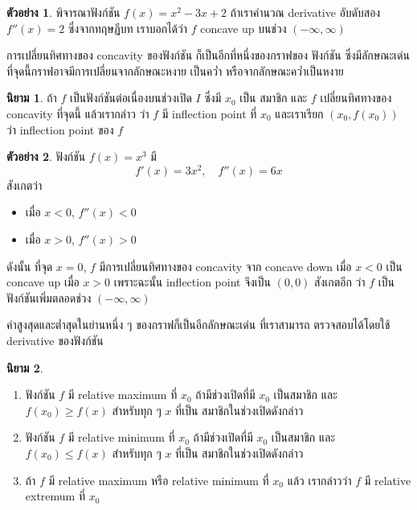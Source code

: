 \documentclass[
]{book}
\theoremstyle{definition}
\newtheorem{definition}{นิยาม}[chapter]
\theoremstyle{definition}
\newtheorem{example}{ตัวอย่าง}[chapter]
\theoremstyle{definition}
\theoremstyle{definition}
\theoremstyle{remark}
\begin{document}
\begin{example}
พิจารณาฟังก์ชัน \(f(x) = x^2-3x+2\) ถ้าเราคำนวณ derivative อับดับสอง \(f''(x) = 2\)
ซึ่งจากทฤษฏีบท เราบอกได้ว่า \(f\) concave up บนช่วง \((-\infty,\infty)\)
\end{example}

การเปลี่ยนทิศทางของ concavity ของฟังก์ชัน ก็เป็นอีกที่หนึ่งของกราฟของ ฟังก์ชัน
ซึ่งมีลักษณะเด่น ที่จุดนี้กราฟอาจมีการเปลี่ยนจากลักษณะหงาย เป็นคว่ำ
หรือจากลักษณะคว่ำเป็นหงาย

\begin{definition}
ถ้า \(f\) เป็นฟังก์ชันต่อเนื่องบนช่วงเปิด \(I\) ซึ่งมี \(x_0\) เป็น สมาชิก และ \(f\)
เปลี่ยนทิศทางของ concavity ที่จุดนี้ แล้วเรากล่าว ว่า \(f\) มี inflection point ที่
\(x_0\) และเราเรียก \((x_0,f(x_0))\) ว่า inflection point ของ \(f\)
\end{definition}

\begin{example}
ฟังก์ชัน \(f(x) = x^3\) มี \[f'(x) = 3x^2, \quad f''(x) = 6x\] สังเกตว่า

\begin{itemize}
\item
  เมื่อ \(x<0\), \(f''(x) < 0\)
\item
  เมื่อ \(x>0\), \(f''(x) >0\)
\end{itemize}

ดังนั้น ที่จุด \(x=0\), \(f\) มีการเปลี่ยนทิศทางของ concavity จาก concave down เมื่อ
\(x<0\) เป็น concave up เมื่อ \(x>0\) เพราะฉะนั้น inflection point จึงเป็น \((0,0)\)
สังเกตอีก ว่า \(f\) เป็นฟังก์ชันเพิ่มตลอดช่วง \((-\infty,\infty)\)
\end{example}

ค่าสูงสุดและต่ำสุดในย่านหนึ่ง ๆ ของกราฟก็เป็นอีกลักษณะเด่น ที่เราสามารถ ตรวจสอบได้โดยใช้
derivative ของฟังก์ชัน

\begin{definition}
\leavevmode

\begin{enumerate}
\def\labelenumi{\arabic{enumi}.}
\item
  ฟังก์ชัน \(f\) มี relative maximum ที่ \(x_0\) ถ้ามีช่วงเปิดที่มี \(x_0\) เป็นสมาชิก และ
  \(f(x_0) \ge f(x)\) สำหรับทุก ๆ \(x\) ที่เป็น สมาชิกในช่วงเปิดดังกล่าว
\item
  ฟังก์ชัน \(f\) มี relative minimum ที่ \(x_0\) ถ้ามีช่วงเปิดที่มี \(x_0\) เป็นสมาชิก และ
  \(f(x_0) \le f(x)\) สำหรับทุก ๆ \(x\) ที่เป็น สมาชิกในช่วงเปิดดังกล่าว
\item
  ถ้า \(f\) มี relative maximum หรือ relative minimum ที่ \(x_0\) แล้ว เรากล่าวว่า
  \(f\) มี relative extremum ที่ \(x_0\)
\end{enumerate}

\end{definition}
\end{document}
